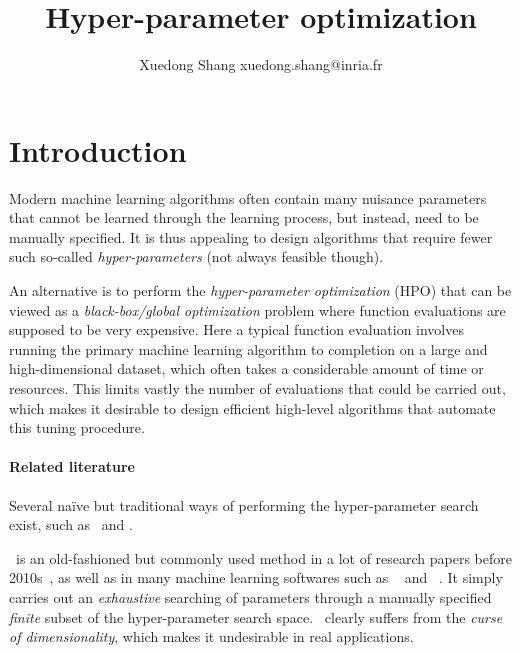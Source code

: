 \documentclass[twoside,11pt]{article}
\begin{document}
\title{\large Hyper-parameter optimization}

\author{\name Xuedong Shang \email xuedong.shang@inria.fr}

\editor{}

\maketitle


\begin{abstract}

\end{abstract}


\section{Introduction}

Modern machine learning algorithms often contain many nuisance parameters that cannot be learned through the learning process, but instead, need to be manually specified. It is thus appealing to design algorithms that require fewer such so-called \emph{hyper-parameters} (not always feasible though).

An alternative is to perform the \emph{hyper-parameter optimization} (HPO) that can be viewed as a \emph{black-box/global optimization} problem where function evaluations are supposed to be very expensive. Here a typical function evaluation involves running the primary machine learning algorithm to completion on a large and high-dimensional dataset, which often takes a considerable amount of time or resources. This limits vastly the number of evaluations that could be carried out, which makes it desirable to design efficient high-level algorithms that automate this tuning procedure.

\paragraph{Related literature}

Several naïve but traditional ways of performing the hyper-parameter search exist, such as \Grid\ and \Random. 

\Grid\ is an old-fashioned but commonly used method in a lot of research papers before 2010s~\citep{lecun1998gradient}, as well as in many machine learning softwares such as \LIBSVM~\citep{chang2011libsvm} and \Scikit~\citep{pedregosa2011sklearn}. It simply carries out an \emph{exhaustive} searching of parameters through a manually specified \emph{finite} subset of the hyper-parameter search space. \Grid\ clearly suffers from the \emph{curse of dimensionality}, which makes it undesirable in real applications.
\end{document}
